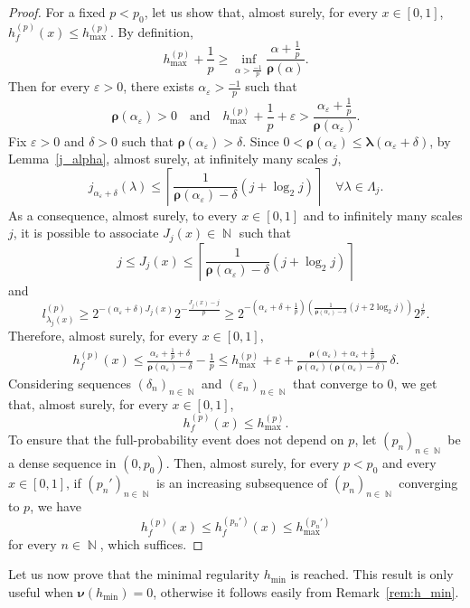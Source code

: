 \documentclass[a4paper,11pt,oneside]{article}
\DeclareMathOperator{\N}{\mathbb{N}}
\newcommand{\ccint}[1]{\left[{#1}\right]}
\newcommand{\ooint}[1]{\left({#1}\right)}
\theoremstyle{definition}
\theoremstyle{plain}
\begin{document}
\begin{proof}
For a fixed $p<p_0$, let us show that, almost surely, for every $x\in\ccint{0,1}$, $h_f^{(p)}(x)\leq h_{\max}^{(p)}$. By definition, 
\[
h_{\max}^{(p)}+\frac{1}{p}
\geq\inf_{\alpha>\frac{-1}{p}}\frac{\alpha+\frac{1}{p}}{\bm{\rho}(\alpha)}.
\]
Then for every $\varepsilon>0$, there exists $\alpha_\varepsilon>\frac{-1}{p}$ such that
\[
\bm{\rho}(\alpha_\varepsilon)>0 \quad\text{and}\quad h_{\max}^{(p)}+\frac{1}{p}+\varepsilon>\frac{\alpha_\varepsilon+\frac{1}{p}}{\bm{\rho}(\alpha_\varepsilon)}.
\]
Fix $\varepsilon>0$ and $\delta>0$ such that $\bm{\rho}(\alpha_\varepsilon)>\delta$. Since $0<\bm{\rho}(\alpha_\varepsilon)\leq\bm{\lambda}(\alpha_\varepsilon+\delta)$, by Lemma~\ref{j_alpha}, almost surely, at infinitely many scales $j$,
\[
j_{\alpha_\varepsilon+\delta}(\lambda)\leq \left\lceil\frac{1}{\bm{\rho}(\alpha_\varepsilon)-\delta}(j+\log_2j)\right\rceil\quad\forall\lambda\in\Lambda_j.
\]
As a consequence, almost surely, to every $x\in\ccint{0,1}$ and to infinitely many scales $j$, it is possible to associate $J_j(x)\in\N$ such that 
\[
j\leq J_j(x)\leq \left\lceil\frac{1}{\bm{\rho}(\alpha_\varepsilon)-\delta}(j+\log_2j)\right\rceil
\]
and
\[
l_{\lambda_j(x)}^{(p)}\geq 2^{-(\alpha_\varepsilon+\delta)J_j(x)}2^{-\frac{J_j(x)-j}{p}}\geq 2^{-\left(\alpha_\varepsilon+\delta+\frac{1}{p}\right)\left(\frac{1}{\bm{\rho}(\alpha_\varepsilon)-\delta}(j+2\log_2j)\right)}2^{\frac{j}{p}}.
\]
Therefore, almost surely, for every $x\in\ccint{0,1}$,
\begin{align*}
h_f^{(p)}(x)
\leq \frac{\alpha_\varepsilon+\frac{1}{p}+\delta}{\bm{\rho}(\alpha_\varepsilon)-\delta}-\frac{1}{p} 
\leq h_{\max}^{(p)}+\varepsilon+\frac{\bm{\rho}(\alpha_\varepsilon)+\alpha_\varepsilon+\frac{1}{p}}{\bm{\rho}(\alpha_\varepsilon)(\bm{\rho}(\alpha_\varepsilon)-\delta)}\,\delta.
\end{align*}
Considering sequences $(\delta_n)_{n\in\N}$ and $(\varepsilon_n)_{n\in\N}$ that converge to 0,
we get that, almost surely, for every $x\in\ccint{0,1}$,
\[
h_f^{(p)}(x)\leq 
h_{\max}^{(p)}.
\]
To ensure that the full-probability event does not depend on $p$, let  $(p_n)_{n\in\N}$ be a dense sequence in $\ooint{0,p_0}$. Then, almost surely, for every $p<p_0$ and every $x\in\ccint{0,1}$, if $(p_n')_{n\in\N}$ is an increasing subsequence of $(p_n)_{n\in\N}$ converging to $p$, we have 
\[
h_f^{(p)}(x)\leq h_f^{(p_n')}(x)\leq h_{\max}^{(p_n')}
\]
for every $n\in\N$, which suffices.
\end{proof}

Let us now prove that the minimal regularity $h_{\min}$ is reached. This result is only useful when $\bm{\nu}(h_{\min})= 0$, otherwise it follows easily from Remark~\ref{rem:h_min}. 
\end{document}
